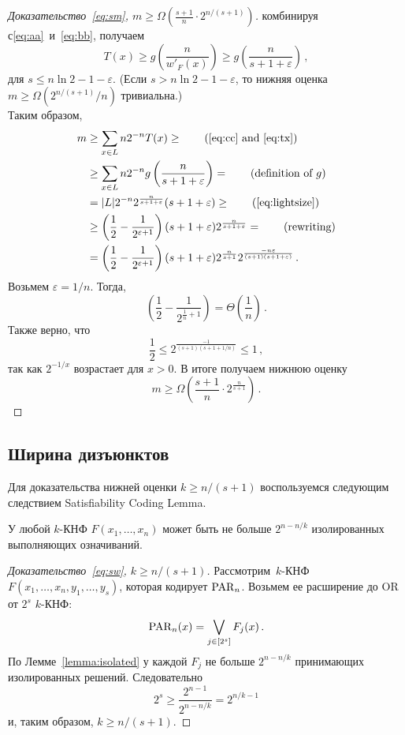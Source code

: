 \begin{proof}[Доказательство~\eqref{eq:sm}, $m \ge \Omega\left(\frac{s+1}{n} \cdot 2^{n/(s+1)}\right)$]
	комбинируя с\eqref{eq:aa}~и~\eqref{eq:bb}, получаем
	\begin{equation}\label{eq:tx}
		T(x) \ge g \left( \frac{n}{w'_F(x)}\right) \ge g \left( \frac{n}{s+1+\varepsilon}\right) \, ,
	\end{equation}
	для $s \le n\ln 2 - 1 -\varepsilon$.
	(Если $s > n\ln 2 - 1 -\varepsilon$, то нижняя оценка $m \ge \Omega(2^{n/(s+1)}/n)$ тривиальна.)\\
	Таким образом,
	\begin{align}
		m &\ge \sum_{x \in L}n2^{-n}T(x) \ge \tag{\ref{eq:cc}~and~\ref{eq:tx}}\\
		& \ge \sum_{x \in L}n2^{-n}g \left( \frac{n}{s+1+\varepsilon}\right)=\tag{definition of~$g$}\\
		&=|L|2^{-n}2^{\frac{n}{s+1+\varepsilon}}(s+1+\varepsilon) \ge\tag{\ref{eq:lightsize}}\\
		&\ge \left(\frac{1}{2} - \frac{1}{2^{\varepsilon + 1}}\right)(s + 1 + \varepsilon) 2^\frac{n}{s + 1 + \varepsilon}=\tag{rewriting}\\
		&=\left(\frac{1}{2} - \frac{1}{2^{\varepsilon + 1}}\right)(s + 1 + \varepsilon) 2^\frac{n}{s + 1} 2^{\frac{-n\varepsilon}{(s+1)(s+1+\varepsilon)}} \,.
	\end{align}
	Возьмем $\varepsilon=1/n$. Тогда,
	\[\left(\frac{1}{2} - \frac{1}{2^{\frac{1}{n} + 1}}\right) = \Theta \left( \frac{1}{n} \right)\,.\]
	Также верно, что
	\[\frac{1}{2} \le 2^{\frac{-1}{(s+1)(s+1+1/n)}} \le 1\,,\]
	так как $2^{-1/x}$ возрастает для $x>0$.
	В итоге получаем нижнюю оценку
	\[m \ge \Omega \left(\frac{s+1}{n} \cdot 2^{\frac{n}{s+1}} \right)\, .\]
\end{proof}
\subsection{Ширина дизъюнктов}
Для доказательства нижней оценки $k \ge n/(s+1)$ воспользуемся следующим следствием Satisfiability Coding Lemma.

\begin{lemma}\label{lemma:isolated}
	У любой $k$-КНФ $F(x_1, \dotsc, x_n)$ может быть не больше $2^{n - n/k}$ изолированных выполняющих означиваний.
\end{lemma}

\begin{proof}[Доказательство~\eqref{eq:sw}, $k \ge n/(s+1)$]
	Рассмотрим~$k$-КНФ $F(x_1, \dotsc, x_n, y_1, \dotsc, y_s)$, которая кодирует $\operatorname{PAR}_n$. Возьмем ее расширение до OR от $2^s$ $k$-КНФ:
	\[\operatorname{PAR}_n(x)=\bigvee_{j \in [2^s]} F_j(x) \, .\]
	По Лемме~\ref{lemma:isolated} у каждой $F_j$ не больше $2^{n - n/k}$ принимающих изолированных решений. Следовательно
	\[2^s \ge \frac{2^{n - 1}}{2^{n - n/k}} = 2^{n/k - 1}\]
	и, таким образом, $k \ge n/(s+1)$.
\end{proof}

